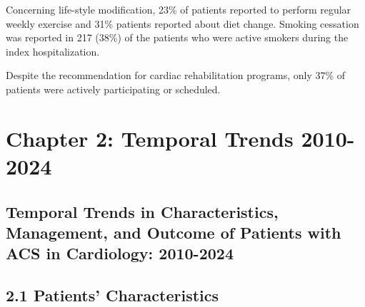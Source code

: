 \documentclass[
]{article}
\begin{document}
Concerning life-style modification, 23\% of patients reported to perform
regular weekly exercise and 31\% patients reported about diet change.
Smoking cessation was reported in 217 (38\%) of the patients who were
active smokers during the index hospitalization.

Despite the recommendation for cardiac rehabilitation programs, only
37\% of patients were actively participating or scheduled. \pagebreak

\section{Chapter 2: Temporal Trends
2010-2024}\label{chapter-2-temporal-trends-2010-2024}

\hfill\break

\subsection{Temporal Trends in Characteristics, Management, and Outcome
of Patients with ACS in Cardiology:
2010-2024}\label{temporal-trends-in-characteristics-management-and-outcome-of-patients-with-acs-in-cardiology-2010-2024}

\hfill\break

\subsection{2.1 Patients'
Characteristics}\label{patients-characteristics}

\hfill\break
\end{document}
